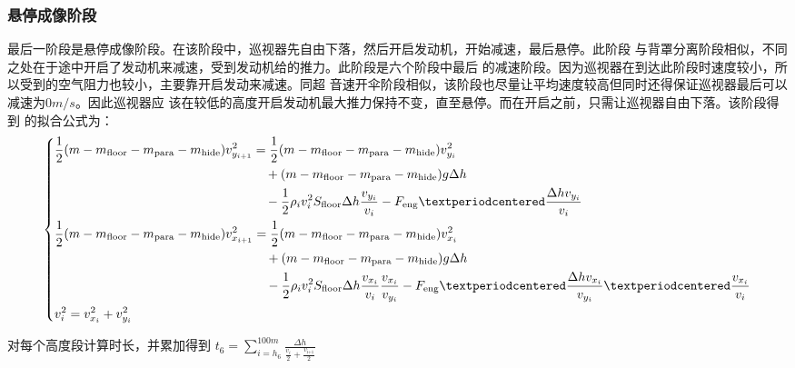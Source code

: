 \documentclass[hyperref,a4paper,UTF8]{ctexart}
\begin{document}
\subsubsection{悬停成像阶段}
最后一阶段是悬停成像阶段。在该阶段中，巡视器先自由下落，然后开启发动机，开始减速，最后悬停。此阶段
与背罩分离阶段相似，不同之处在于途中开启了发动机来减速，受到发动机给的推力。此阶段是六个阶段中最后
的减速阶段。因为巡视器在到达此阶段时速度较小，所以受到的空气阻力也较小，主要靠开启发动来减速。同超
音速开伞阶段相似，该阶段也尽量让平均速度较高但同时还得保证巡视器最后可以减速为$0m/s$。因此巡视器应
该在较低的高度开启发动机最大推力保持不变，直至悬停。而在开启之前，只需让巡视器自由下落。该阶段得到
的拟合公式为：
\[
    \begin{dcases}
        \begin{split}
            \frac{1}{2}(m-m_{\text{floor}}-m_{\text{para}}-m_{\text{hide}})v_{y_{i + 1}}^2 &=
            \frac{1}{2}(m-m_{\text{floor}}-m_{\text{para}}-m_{\text{hide}})
            v_{y_{i}}^2 \\ &\quad + (m-m_{\text{floor}}-m_{\text{para}}-m_{\text{hide}})
            g\Delta h\\ &\quad -\frac{1}{2}\rho _iv_i^2S_{\text{floor}}\Delta h
            \frac{v_{y_i}}{v_i} - F_{\text{eng}}·\frac{\Delta hv_{y_i}}{v_i}
        \end{split}
        \\
        \begin{split}
            \frac{1}{2}(m-m_{\text{floor}}-m_{\text{para}}-m_{\text{hide}})v_{x_{i + 1}}^2 &=
            \frac{1}{2}(m-m_{\text{floor}}-m_{\text{para}}-m_{\text{hide}})
            v_{x_{i}}^2 \\ &\quad + (m-m_{\text{floor}}-m_{\text{para}}-m_{\text{hide}})
            g\Delta h \\ &\quad -\frac{1}{2}\rho _iv_i^2S_{\text{floor}}\Delta h
            \frac{v_{x_i}}{v_i}\frac{v_{x_i}}{v_{y_i}} -
            F_{\text{eng}}·\frac{\Delta hv_{x_i}}{v_{y_i}}·\frac{v_{x_i}}{v_i}
        \end{split}
        \\
        v_i^2 = v_{x_i}^2 + v_{y_i}^2
    \end{dcases}
\]

对每个高度段计算时长，并累加得到
$
    \displaystyle t_6=\sum_{i=h_6}^{100m}{\displaystyle\frac{\Delta h}{\frac{\displaystyle v_i}
        {\displaystyle 2}+\frac{\displaystyle v_{\textrm{i+1}} }{\displaystyle 2}}}
$
\end{document}
